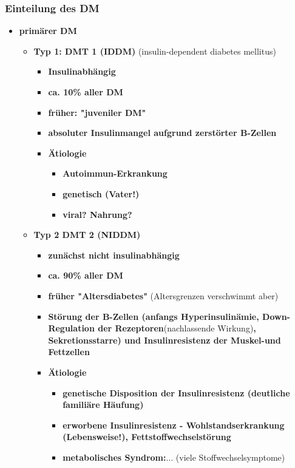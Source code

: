 	\subsubsection{Einteilung des DM}
		\begin{itemize}
			\item \textbf{primärer DM}
				\begin{itemize}
					\item \textbf{Typ 1: DMT 1 (IDDM)} (insulin-dependent diabetes mellitus)
						\begin{itemize}
							\item \textbf{Insulinabhängig}
							\item \textbf{ca. 10\% aller DM}
							\item \textbf{früher: "juveniler DM"}
							\item \textbf{absoluter Insulinmangel aufgrund zerstörter B-Zellen}
							\item \textbf{Ätiologie}
								\begin{itemize}
									\item \textbf{Autoimmun-Erkrankung}
									\item \textbf{genetisch (Vater!)}
									\item \textbf{viral? Nahrung?}
								\end{itemize}
						\end{itemize}
					\item \textbf{Typ 2 DMT 2 (NIDDM)}
						\begin{itemize}
							\item \textbf{zunächst nicht insulinabhängig}
							\item \textbf{ca. 90\% aller DM}
							\item \textbf{früher "Altersdiabetes"} (Altersgrenzen verschwimmt aber)
							\item \textbf{Störung der B-Zellen (anfangs Hyperinsulinämie, Down-Regulation der Rezeptoren}(nachlassende Wirkung)\textbf{, Sekretionsstarre) und Insulinresistenz der Muskel-und Fettzellen}
							\item \textbf{Ätiologie}
								\begin{itemize}
									\item \textbf{genetische Disposition der Insulinresistenz (deutliche familiäre Häufung)}
									\item \textbf{erworbene Insulinresistenz - Wohlstandserkrankung (Lebensweise!), Fettstoffwechselstörung}
									\item \textbf{metabolisches Syndrom:$\dots$} (viele Stoffwechselsymptome)

\end{itemize}
\end{itemize}
\end{itemize}
\end{itemize}
